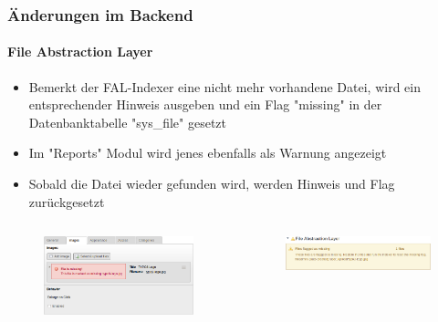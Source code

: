 \begin{frame}[fragile]
	\frametitle{Änderungen im Backend}
	\framesubtitle{File Abstraction Layer}

	\begin{itemize}
		\item Bemerkt der FAL-Indexer eine nicht mehr vorhandene Datei, wird ein entsprechender Hinweis ausgeben und ein Flag "missing" in der Datenbanktabelle "sys\_file" gesetzt
		\item Im "Reports" Modul wird jenes ebenfalls als Warnung angezeigt
		\item Sobald die Datei wieder gefunden wird, werden Hinweis und Flag zurückgesetzt
	\end{itemize}

	\begin{columns}[T]

		\begin{column}{.5\textwidth}
			\begin{figure}\vspace*{-0.4cm}
				\includegraphics[width=0.9\linewidth]{Images/BackendChanges/FalMissingFileContentElement.png}
			\end{figure}
		\end{column}

		\begin{column}{.5\textwidth}
			\begin{figure}\vspace*{-0.4cm}
				\includegraphics[width=0.9\linewidth]{Images/BackendChanges/FalMissingFileReportsModule.png}
			\end{figure}
		\end{column}

	\end{columns}

\end{frame}

